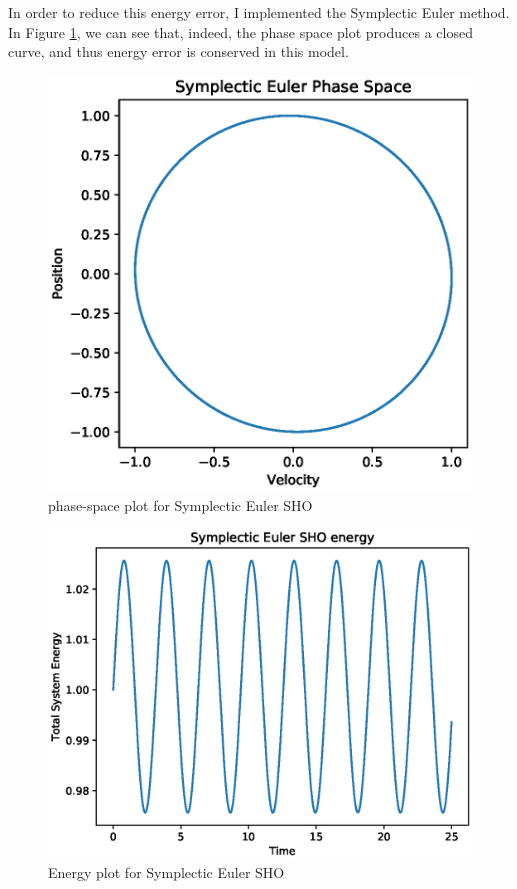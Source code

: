 \documentclass{article}
\begin{document}
\newpage 

In order to reduce this energy error, I implemented the Symplectic Euler method.  In Figure \ref{fig:sym_phase}, we can see that, indeed, the phase space plot produces a closed curve, and thus energy error is conserved in this model.  

\begin{figure}[h!]
\centering
\includegraphics[scale=0.75]{fig/symplectic_phase_plot.eps}
\caption{phase-space plot for Symplectic Euler SHO}
\label{fig:sym_phase}
\end{figure}

\newpage

\begin{figure}[h!]
\centering
\includegraphics[scale=0.75]{fig/symplectic_energy.eps}
\caption{Energy plot for Symplectic Euler SHO}
\label{fig:sym_energy}
\end{figure}
\end{document}
